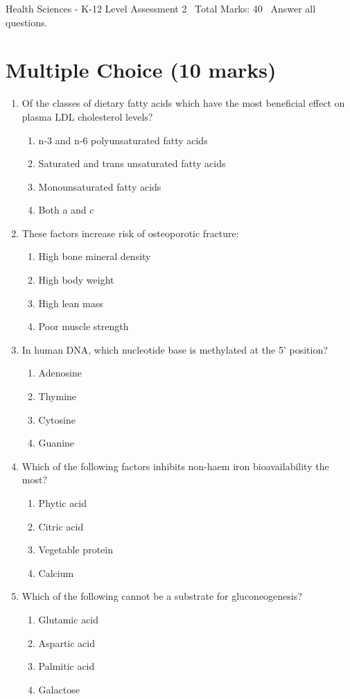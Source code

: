 \documentclass[12pt]{article}
\begin{document}
\begin{center}
Health Sciences - K-12 Level Assessment 2 \
Total Marks: 40 \
Answer all questions.
\end{center}

\section*{Multiple Choice (10 marks)}
\begin{enumerate}[label=\arabic*.]
\item Of the classes of dietary fatty acids which have the most beneficial effect on plasma LDL cholesterol levels?
\begin{enumerate}[label=(\alph*)]
    \item n-3 and n-6 polyunsaturated fatty acids
    \item Saturated and trans unsaturated fatty acids
    \item Monounsaturated fatty acids
    \item Both a and c
\end{enumerate}
\item These factors increase risk of osteoporotic fracture:
\begin{enumerate}[label=(\alph*)]
    \item High bone mineral density
    \item High body weight
    \item High lean mass
    \item Poor muscle strength
\end{enumerate}
\item In human DNA, which nucleotide base is methylated at the 5' position?
\begin{enumerate}[label=(\alph*)]
    \item Adenosine
    \item Thymine
    \item Cytosine
    \item Guanine
\end{enumerate}
\item Which of the following factors inhibits non-haem iron bioavailability the most?
\begin{enumerate}[label=(\alph*)]
    \item Phytic acid
    \item Citric acid
    \item Vegetable protein
    \item Calcium
\end{enumerate}
\item Which of the following cannot be a substrate for gluconeogenesis?
\begin{enumerate}[label=(\alph*)]
    \item Glutamic acid
    \item Aspartic acid
    \item Palmitic acid
    \item Galactose
\end{enumerate}
\end{enumerate}
\end{document}
